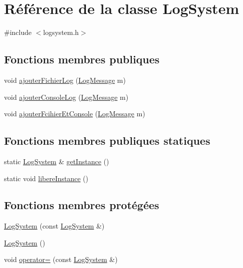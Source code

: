 \hypertarget{class_log_system}{\section{\-Référence de la classe \-Log\-System}
\label{class_log_system}
}


{\ttfamily \#include $<$logsystem.\-h$>$}

\subsection*{\-Fonctions membres publiques}
\begin{DoxyCompactItemize}
\item 
void \hyperlink{class_log_system_a26650fa1e4d9792106e4c3ddd727aaa9}{ajouter\-Fichier\-Log} (\hyperlink{class_log_message}{\-Log\-Message} m)
\item 
void \hyperlink{class_log_system_ad18f58f1ad0e8f23dc524c2f55d3e8fc}{ajouter\-Console\-Log} (\hyperlink{class_log_message}{\-Log\-Message} m)
\item 
void \hyperlink{class_log_system_a29ba53a9628ac2c2c517bf751cb84a9a}{ajouter\-Fcihier\-Et\-Console} (\hyperlink{class_log_message}{\-Log\-Message} m)
\end{DoxyCompactItemize}
\subsection*{\-Fonctions membres publiques statiques}
\begin{DoxyCompactItemize}
\item 
static \hyperlink{class_log_system}{\-Log\-System} \& \hyperlink{class_log_system_ab5b398fac784d6c20576829056a364a2}{get\-Instance} ()
\item 
static void \hyperlink{class_log_system_a96ec47ba20361122fb990ef8e9729b82}{libere\-Instance} ()
\end{DoxyCompactItemize}
\subsection*{\-Fonctions membres protégées}
\begin{DoxyCompactItemize}
\item 
\hyperlink{class_log_system_adc3513336bc3959e888b343ce6304922}{\-Log\-System} (const \hyperlink{class_log_system}{\-Log\-System} \&)
\item 
\hyperlink{class_log_system_ac891dbbf0efb28b572555ee797b56998}{\-Log\-System} ()
\item 
void \hyperlink{class_log_system_a259a97306f0a436f4d8b767b3b0ab8b2}{operator=} (const \hyperlink{class_log_system}{\-Log\-System} \&)
\end{DoxyCompactItemize}


